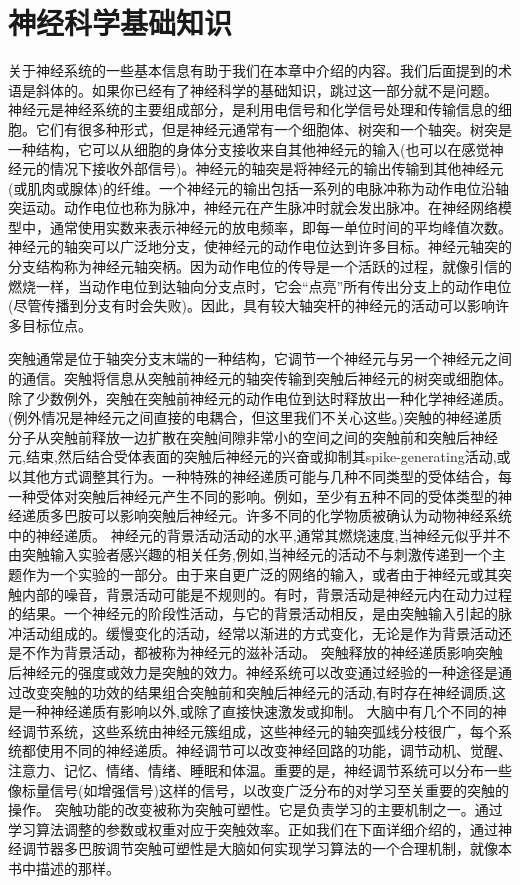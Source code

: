\section{神经科学基础知识}

关于神经系统的一些基本信息有助于我们在本章中介绍的内容。我们后面提到的术语是斜体的。如果你已经有了神经科学的基础知识，跳过这一部分就不是问题。
神经元是神经系统的主要组成部分，是利用电信号和化学信号处理和传输信息的细胞。它们有很多种形式，但是神经元通常有一个细胞体、树突和一个轴突。树突是一种结构，它可以从细胞的身体分支接收来自其他神经元的输入(也可以在感觉神经元的情况下接收外部信号)。神经元的轴突是将神经元的输出传输到其他神经元(或肌肉或腺体)的纤维。一个神经元的输出包括一系列的电脉冲称为动作电位沿轴突运动。动作电位也称为脉冲，神经元在产生脉冲时就会发出脉冲。在神经网络模型中，通常使用实数来表示神经元的放电频率，即每一单位时间的平均峰值次数。
神经元的轴突可以广泛地分支，使神经元的动作电位达到许多目标。神经元轴突的分支结构称为神经元轴突柄。因为动作电位的传导是一个活跃的过程，就像引信的燃烧一样，当动作电位到达轴向分支点时，它会“点亮”所有传出分支上的动作电位(尽管传播到分支有时会失败)。因此，具有较大轴突杆的神经元的活动可以影响许多目标位点。

突触通常是位于轴突分支末端的一种结构，它调节一个神经元与另一个神经元之间的通信。突触将信息从突触前神经元的轴突传输到突触后神经元的树突或细胞体。除了少数例外，突触在突触前神经元的动作电位到达时释放出一种化学神经递质。(例外情况是神经元之间直接的电耦合，但这里我们不关心这些。)突触的神经递质分子从突触前释放一边扩散在突触间隙非常小的空间之间的突触前和突触后神经元,结束,然后结合受体表面的突触后神经元的兴奋或抑制其spike-generating活动,或以其他方式调整其行为。一种特殊的神经递质可能与几种不同类型的受体结合，每一种受体对突触后神经元产生不同的影响。例如，至少有五种不同的受体类型的神经递质多巴胺可以影响突触后神经元。许多不同的化学物质被确认为动物神经系统中的神经递质。
神经元的背景活动活动的水平,通常其燃烧速度,当神经元似乎并不由突触输入实验者感兴趣的相关任务,例如,当神经元的活动不与刺激传递到一个主题作为一个实验的一部分。由于来自更广泛的网络的输入，或者由于神经元或其突触内部的噪音，背景活动可能是不规则的。有时，背景活动是神经元内在动力过程的结果。一个神经元的阶段性活动，与它的背景活动相反，是由突触输入引起的脉冲活动组成的。缓慢变化的活动，经常以渐进的方式变化，无论是作为背景活动还是不作为背景活动，都被称为神经元的滋补活动。
突触释放的神经递质影响突触后神经元的强度或效力是突触的效力。神经系统可以改变通过经验的一种途径是通过改变突触的功效的结果组合突触前和突触后神经元的活动,有时存在神经调质,这是一种神经递质有影响以外,或除了直接快速激发或抑制。
大脑中有几个不同的神经调节系统，这些系统由神经元簇组成，这些神经元的轴突弧线分枝很广，每个系统都使用不同的神经递质。神经调节可以改变神经回路的功能，调节动机、觉醒、注意力、记忆、情绪、情绪、睡眠和体温。重要的是，神经调节系统可以分布一些像标量信号(如增强信号)这样的信号，以改变广泛分布的对学习至关重要的突触的操作。
突触功能的改变被称为突触可塑性。它是负责学习的主要机制之一。通过学习算法调整的参数或权重对应于突触效率。正如我们在下面详细介绍的，通过神经调节器多巴胺调节突触可塑性是大脑如何实现学习算法的一个合理机制，就像本书中描述的那样。

